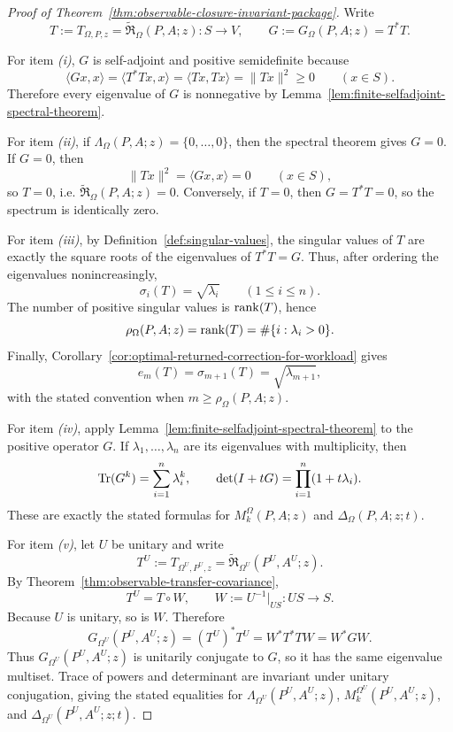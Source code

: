 \begin{proof}[Proof of Theorem~\ref{thm:observable-closure-invariant-package}]
\label{proof:thm:observable-closure-invariant-package}
Write
\[
T:=T_{\Omega,P,z}
=
\widetilde{\mathfrak R}_{\Omega}(P,A;z):S\to V,
\qquad
G:=G_{\Omega}(P,A;z)=T^\ast T.
\]

For item \emph{(i)}, \(G\) is self-adjoint and positive semidefinite because
\[
\langle Gx,x\rangle
=
\langle T^\ast T x,x\rangle
=
\langle Tx,Tx\rangle
=
\|Tx\|^2
\ge 0
\qquad (x\in S).
\]
Therefore every eigenvalue of \(G\) is nonnegative by
Lemma~\ref{lem:finite-selfadjoint-spectral-theorem}.

For item \emph{(ii)}, if \(\Lambda_{\Omega}(P,A;z)=\{0,\dots,0\}\), then the
spectral theorem gives \(G=0\). If \(G=0\), then
\[
\|Tx\|^2=\langle Gx,x\rangle=0
\qquad (x\in S),
\]
so \(T=0\), i.e.
\(\widetilde{\mathfrak R}_{\Omega}(P,A;z)=0\). Conversely, if \(T=0\), then
\(G=T^\ast T=0\), so the spectrum is identically zero.

For item \emph{(iii)}, by Definition~\ref{def:singular-values}, the singular
values of \(T\) are exactly the square roots of the eigenvalues of \(T^\ast T=G\).
Thus, after ordering the eigenvalues nonincreasingly,
\[
\sigma_i(T)=\sqrt{\lambda_i}
\qquad (1\le i\le n).
\]
The number of positive singular values is \(\mathrm{rank}(T)\), hence
\[
\rho_{\Omega}(P,A;z)=\mathrm{rank}(T)=\#\{i:\lambda_i>0\}.
\]
Finally, Corollary~\ref{cor:optimal-returned-correction-for-workload} gives
\[
e_m(T)=\sigma_{m+1}(T)=\sqrt{\lambda_{m+1}},
\]
with the stated convention when \(m\ge \rho_{\Omega}(P,A;z)\).

For item \emph{(iv)}, apply
Lemma~\ref{lem:finite-selfadjoint-spectral-theorem} to the positive operator
\(G\). If \(\lambda_1,\dots,\lambda_n\) are its eigenvalues with multiplicity,
then
\[
\mathrm{Tr}(G^k)=\sum_{i=1}^{n}\lambda_i^k,
\qquad
\det(I+tG)=\prod_{i=1}^{n}(1+t\lambda_i).
\]
These are exactly the stated formulas for
\(M_k^{\Omega}(P,A;z)\) and \(\Delta_{\Omega}(P,A;z;t)\).

For item \emph{(v)}, let \(U\) be unitary and write
\[
T^U:=T_{\Omega^U,P^U,z}
=
\widetilde{\mathfrak R}_{\Omega^U}(P^U,A^U;z).
\]
By Theorem~\ref{thm:observable-transfer-covariance},
\[
T^U=T\circ W,
\qquad
W:=U^{-1}\big|_{US}:US\to S.
\]
Because \(U\) is unitary, so is \(W\). Therefore
\[
G_{\Omega^U}(P^U,A^U;z)
=
(T^U)^\ast T^U
=
W^\ast T^\ast T W
=
W^\ast G W.
\]
Thus \(G_{\Omega^U}(P^U,A^U;z)\) is unitarily conjugate to \(G\), so it has the
same eigenvalue multiset. Trace of powers and determinant are invariant under
unitary conjugation, giving the stated equalities for
\(\Lambda_{\Omega^U}(P^U,A^U;z)\), \(M_k^{\Omega^U}(P^U,A^U;z)\), and
\(\Delta_{\Omega^U}(P^U,A^U;z;t)\).
\end{proof}

